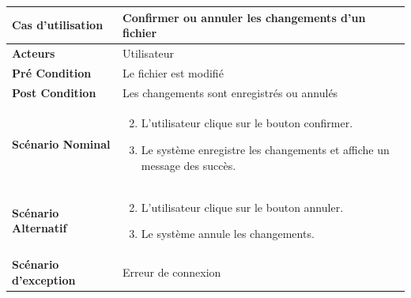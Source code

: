 \begin{longtable}{|p{5cm}|p{10cm}|}
\hline
\textbf{Cas d'utilisation}&Confirmer ou annuler les changements d'un fichier\\
\hline
\textbf{Acteurs}&Utilisateur\\
\hline
\textbf{Pré Condition}&Le fichier est modifié\\
\hline
\textbf{Post Condition}&Les changements sont enregistrés ou annulés\\
\hline
\textbf{Scénario Nominal}&
\vspace{-\baselineskip}
\begin{enumerate}
    \setcounter{enumi}{1}
    \item L'utilisateur clique sur le bouton confirmer.
    \item Le système enregistre les changements et affiche un message des succès.
\end{enumerate}\\
\hline
\textbf{Scénario Alternatif}&
\vspace{-\baselineskip}
\begin{enumerate}
    \setcounter{enumi}{1}
    \item L'utilisateur clique sur le bouton annuler.
    \item Le système annule les changements.
\end{enumerate}\\
\hline
\textbf{Scénario d'exception}&Erreur de connexion\\
\hline
\end{longtable}




